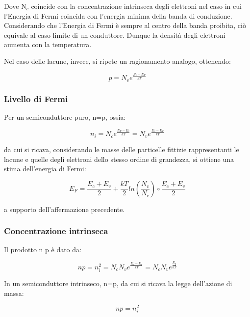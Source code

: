 \documentclass{article}
\begin{document}
Dove N$_c$ coincide con la concentrazione intrinseca degli elettroni nel caso in cui l'Energia di Fermi coincida con l'energia minima della banda di conduzione.
Considerando che l'Energia di Fermi è sempre al centro della banda proibita, ciò equivale al caso limite di un conduttore.
Dunque la densità degli elettroni aumenta con la temperatura.

Nel caso delle lacune, invece, si ripete un ragionamento analogo, ottenendo:

\begin{equation}
    p = N_v e^{\frac{E_v-E_F}{kT}}
\end{equation}

\subsubsection{Livello di Fermi}

Per un semiconduttore puro, n=p, ossia:

\begin{equation}
    n_i = N_c e^{\frac{E_F-E_c}{kT}} = N_v e^{\frac{E_v-E_F}{kT}}
\end{equation}

da cui si ricava, considerando le masse delle particelle fittizie rappresentanti le lacune e quelle degli elettroni dello stesso ordine di grandezza, si ottiene
una stima dell'energia di Fermi:

\begin{equation}
    E_F = \frac{E_c + E_v}{2} + \frac{kT}{2} ln(\frac{N_v}{N_c})\circ \frac{E_c+E_v}{2}
\end{equation}

a supporto dell'affermazione precedente.

\subsubsection{Concentrazione intrinseca}

Il prodotto n p è dato da:

\begin{equation}
    n p = n_i^2 = N_c N_v e^{\frac{E_c-E_v}{kT}}= N_c N_v e^{\frac{E_g}{kT}}
\end{equation}

In un semiconduttore intrinseco, n=p, da cui si ricava la legge dell'azione di massa:

\begin{equation}
  np = n_i^2
\end{equation}
\end{document}
